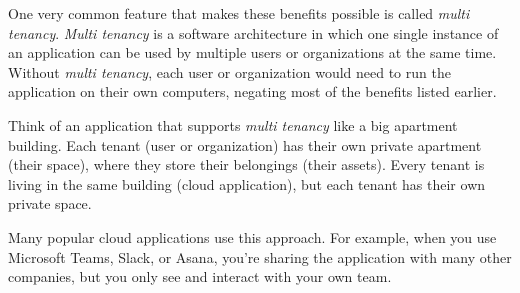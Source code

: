 

One very common feature that makes these benefits possible is called \textit{multi tenancy}.
\textit{Multi tenancy} is a software architecture in which one single instance of an application
can be used by multiple users or organizations at the same time.
Without \textit{multi tenancy}, each user or organization would need to run the application on
their own computers,
negating most of the benefits listed earlier.


Think of an application that supports \textit{multi tenancy} like a big apartment building.
Each tenant (user or organization) has their
own private apartment (their space), where they store their belongings (their assets).
Every tenant is living in the same building (cloud application), but each tenant has their
own private space.

Many popular cloud applications use this approach. For example, when you use Microsoft Teams,
Slack, or Asana, you're sharing the application with many other companies, but you only
see and interact with your own team.

